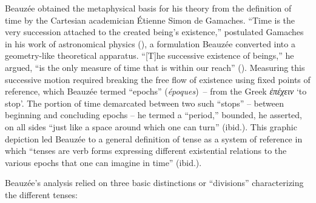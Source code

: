 \documentclass[english,output=paper,colorlinks,citecolor=brown]{../langscibook}
\begin{document}
 Beauzée obtained the metaphysical basis for his theory from the definition of time by the Cartesian academician Étienne Simon de Gamaches. “Time is the very succession attached to the created being’s existence,” postulated Gamaches in his work of astronomical physics (\citeyear[28]{Gamaches1740}), a formulation Beauzée converted into a geometry-like theoretical apparatus. “[T]he successive existence of beings,” he argued, “is the only measure of time that is within our reach” (\citealt[96]{Beauzée1765}). Measuring this successive motion required breaking the free flow of existence using fixed points of reference, which Beauzée termed “epochs” (\textit{époques})~-- from the Greek \textit{ἐπέχειν} `to stop'. The portion of time demarcated between two such “stops” -- between beginning and concluding epochs -- he termed a “period,” bounded, he asserted, on all sides “just like a space around which one can turn” (ibid.). This graphic depiction led Beauzée to a general definition of tense as a system of reference in which “tenses are verb forms expressing different existential relations to the various epochs that one can imagine in time” (ibid.).
 
 Beauzée’s analysis relied on three basic distinctions or “divisions” characterizing the different tenses:
 
\end{document}
